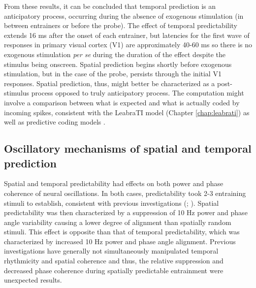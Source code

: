 \documentclass[dwyatte_dissertation.tex]{subfiles}
\begin{document}
From these results, it can be concluded that temporal prediction is an anticipatory process, occurring during the absence of exogenous stimulation (in between entrainers or before the probe). The effect of temporal predictability extends 16 ms after the onset of each entrainer, but latencies for the first wave of responses in primary visual cortex (V1) are approximately 40-60 ms \cite{NowakBullier97,FoxeSimpson02} so there is no exogenous stimulation \textit{per se} during the duration of the effect despite the stimulus being onscreen. Spatial prediction begins shortly before exogenous stimulation, but in the case of the probe, persists through the initial V1 responses. Spatial prediction, thus, might better be characterized as a post-stimulus process opposed to truly anticipatory process. The computation might involve a comparison between what is expected and what is actually coded by incoming spikes, consistent with the LeabraTI model (Chapter \ref{chap:leabrati}) as well as predictive coding models \cite[e.g.,]{RaoBallard99,Friston05,DenOudenKokDeLange12}.

\subsection{Oscillatory mechanisms of spatial and temporal prediction}
Spatial and temporal predictability had effects on both power and phase coherence of neural oscillations. In both cases, predictability took 2-3 entraining stimuli to establish, consistent with previous investigations (; ). Spatial predictability was then characterized by a suppression of 10 Hz power and phase angle variability causing a lower degree of alignment than spatially random stimuli. This effect is opposite than that of temporal predictability, which was characterized by increased 10 Hz power and phase angle alignment. Previous investigations have generally not simultaneously manipulated temporal rhythmicity and spatial coherence \cite[although see]{DohertyRaoMesulamEtAl05,RohenkohlGouldPessoaEtAl14} and thus, the relative suppression and decreased phase coherence during spatially predictable entrainment were unexpected results.
\end{document}
